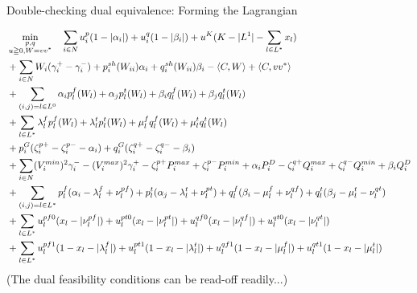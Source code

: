 \documentclass[xcolor=dvipsnames]{beamer}
\newcommand{\ii}{i}
\newcommand{\WW}{W}
\begin{document}
\begin{frame}{Double-checking dual equivalence: Forming the Lagrangian}
\begin{tiny}
\begin{subequations}
\begin{align}
&\min_{\substack{p,q\\ u \geqq 0,W=vv^*}} \quad 
  \sum_{i \in N} u_i^{p}(1-|\alpha_{\ii}|) +  u_i^{q}(1-|\beta_{\ii}|)   
+ u^K(K-|L^1|-\sum_{l \in L^*} x_l) \notag \\
  &+\sum_{\ii \in N} W_\ii(\gamma_{\ii}^+-\gamma_{\ii}^-) +p_\ii^{sh}(\WW_{ii})\alpha_\ii + q_\ii^{sh}(\WW_{ii})\beta_\ii - \langle C , \WW \rangle + \langle C, v v^* \rangle \notag\\
&+\sum_{(i,j)=l \in L^0} \alpha_i p_l^f(\WW_l) + \alpha_j p_l^t(\WW_l) + \beta_i q_l^f(\WW_l) + \beta_j q_l^t(\WW_l) \notag\\
&+\sum_{l \in L^*} \lambda_l^f p_l^f(\WW_l) + \lambda_l^t p_l^t(\WW_l) + \mu_l^f q_l^f(\WW_l) + \mu_l^t q_l^t(\WW_l) \notag\\
&+ p_\ii^G(\zeta_\ii^{p+}-\zeta_\ii^{p-} - \alpha_\ii) + q_\ii^G(\zeta_\ii^{q+}-\zeta_\ii^{q-} - \beta_\ii)\notag \\
  &+\sum_{\ii \in N}  (V_\ii^{min})^2 \gamma_\ii^- - (V_\ii^{max})^2 \gamma_\ii^+ 
- \zeta_\ii^{p+}P_\ii^{max} + \zeta_\ii^{p-}P_\ii^{min} + \alpha_\ii P_\ii^D 
- \zeta_\ii^{q+}Q_\ii^{max} + \zeta_\ii^{q-}Q_\ii^{min} + \beta_\ii Q_\ii^D \notag \\
  &+ \sum_{(i,j)=l \in L^* } p_{l}^{f}(\alpha_i-\lambda_l^f+\nu_l^{pf}) + p_{l}^{t}(\alpha_j-\lambda_l^t + \nu_l^{pt}) 
                 + q_{l}^{f}(\beta_i-\mu_l^f+\nu_l^{qf}) + q_{l}^{t}(\beta_j-\mu_l^t-\nu_l^{qt})  \notag \\
  & + \sum_{l \in L^* } u_l^{pf0}(x_l-|\nu_l^{pf}|) + u_l^{pt0}(x_l-|\nu_l^{pt}|) + u_l^{qf0}(x_l-|\nu_l^{qf}|) + u_l^{qt0}(x_l - |\nu_l^{qt}|) \notag \\
& + \sum_{l \in L^* } u_l^{pf1}(1-x_l - |\lambda_l^f|) + u_l^{pt1}(1-x_l-|\lambda_l^t|) + u_l^{qf1}(1-x_l-|\mu_l^f|) + u_l^{qt1}(1-x_l-|\mu_l^t|) \notag
\end{align}
\end{subequations}
(The dual feasibility conditions can be read-off readily...)
\end{tiny}
\end{frame}
\end{document}
